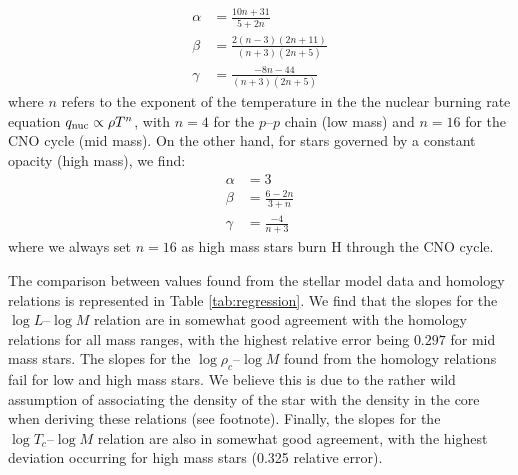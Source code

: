 \begin{align}
    \alpha & = \frac{10n +31}{5 + 2n}                                                              \\
    \beta  & =  \frac{2\left(n-3 \right)\left(2n+11 \right)}{\left(n+3 \right)\left(2n+ 5 \right)} \\
    \gamma & = \frac{-8n - 44}{\left(n+3 \right)\left(2n+ 5 \right)}
\end{align}
where $n$ refers to the exponent of the temperature in the the nuclear burning rate equation $q_{\rm nuc} \propto \rho T^n $, with $n=4$ for the $p\text{--}p$ chain (low mass) and $n=16$ for the CNO cycle (mid mass). On the other hand, for stars governed by a constant opacity (high mass), we find:
\begin{align}
    \alpha & = 3                 \\
    \beta  & =  \frac{6-2n}{3+n} \\
    \gamma & =  \frac{-4}{n+3}
\end{align}
where we always set $n=16$ as high mass stars burn H through the CNO cycle.

The comparison between values found from the stellar model data and homology relations is represented in Table \ref{tab:regression}. We find that the slopes for the $\log L \text{--} \log M$ relation are in somewhat good agreement with the homology relations for all mass ranges, with the highest relative error being $0.297$ for mid mass stars.
The slopes for the $\log \rho_c \text{--} \log M$ found from the homology relations fail for low and high mass stars. We believe this is due to the rather wild assumption of associating the density of the star with the density in the core when deriving these relations (see footnote).
Finally, the slopes for the $\log T_c \text{--} \log M$ relation are also in somewhat good agreement, with the highest deviation occurring for high mass stars (0.325 relative error).




